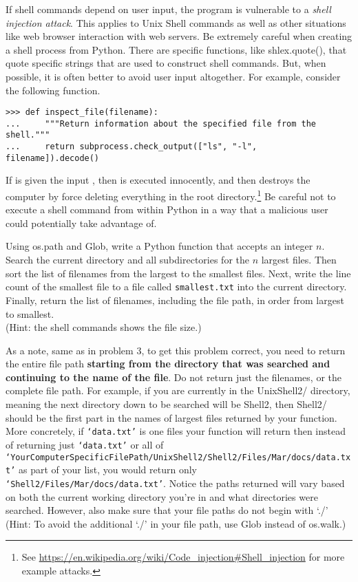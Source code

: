 \begin{warn}
If shell commands depend on user input, the program is vulnerable to a \emph{shell injection attack}.
This applies to Unix Shell commands as well as other situations like web browser interaction with web servers.
Be extremely careful when creating a shell process from Python.
There are specific functions, like shlex.quote(), that quote specific strings that are used to construct shell commands.
But, when possible, it is often better to avoid user input altogether.
For example, consider the following function.
\begin{lstlisting}
>>> def inspect_file(filename):
...     """Return information about the specified file from the shell."""
...     return subprocess.check_output(["ls", "-l", filename]).decode()
\end{lstlisting}
If  is given the input , then  is executed innocently, and then  destroys the computer by force deleting everything in the root directory.\footnote{See \url{https://en.wikipedia.org/wiki/Code_injection\#Shell_injection} for more example attacks.}
Be careful not to execute a shell command from within Python in a way that a malicious user could potentially take advantage of.
\end{warn}

\begin{problem}
Using os.path and Glob, write a Python function that accepts an integer $n$.
Search the current directory and all subdirectories for the $n$ largest files.
Then sort the list of filenames from the largest to the smallest files.
Next, write the line count of the smallest file to a file called \texttt{smallest.txt} into the current directory.
Finally, return the list of filenames, including the file path, in order from largest to smallest.
\\(Hint: the shell commands  shows the file size.)

As a note, same as in problem 3, to get this problem correct, you need to return the entire file path \textbf{starting from the directory that was searched and continuing to the name of the file}. Do not return just the filenames, or the complete file path. 
For example, if you are currently in the UnixShell2/ directory, meaning the next directory down to be searched will be Shell2, then Shell2/ should be the first part in the names of largest files returned by your function. More concretely, if \texttt{`data.txt'} is one files your function will return then instead of returning just \texttt{`data.txt'} or all of\\ \texttt{`YourComputerSpecificFilePath/UnixShell2/Shell2/Files/Mar/docs/data.txt'} as part of your list, you would return only \texttt{`Shell2/Files/Mar/docs/data.txt'}. Notice the paths returned will vary based on both the current working directory you're in and what directories were searched. However, also make sure that your file paths do not begin with `./' (Hint: To avoid the additional `./' in your file path, use Glob instead of os.walk.)
\end{problem}

